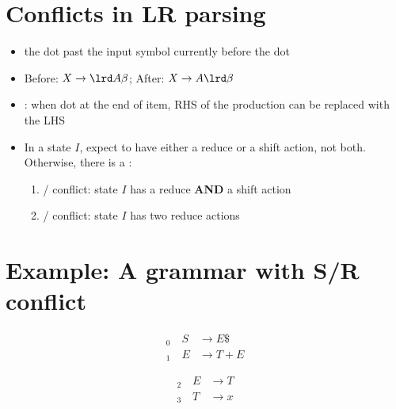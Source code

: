 \section*{Conflicts in LR parsing}
\begin{itemize}
\item {} the dot past the input symbol currently before the dot
\item[] Before: $X\to \lrd A\beta$; After: $X\to A\lrd\beta$
\item {}: when dot at the end of item, RHS of the production can be replaced with the LHS
\item In a state $I$, expect to have either a reduce or a shift action, not both. Otherwise, there is a :
  \begin{enumerate}
  \item {}/ conflict: state $I$ has a reduce \textbf{AND} a shift action
  \item {}/ conflict: state $I$ has two reduce actions
  \end{enumerate}
\end{itemize}
\section*{Example: A grammar with S/R conflict}
\begin{minipage}{.5\linewidth}
\begin{align*}
  _0\quad S&\to E\$   \\
  _1\quad E&\to T + E
\end{align*}
\end{minipage}
\begin{minipage}{.5\linewidth}
\begin{align*}
  _2\quad E&\to T \\
  _3\quad T&\to x
\end{align*}
\end{minipage}
